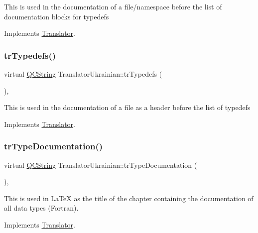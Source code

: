 This is used in the documentation of a file/namespace before the list of documentation blocks for typedefs 

Implements \mbox{\hyperlink{class_translator}{Translator}}.

\mbox{\label{class_translator_ukrainian_aa6afa4bd0bea30c61456a1add6b651b0}} 
\subsubsection{\texorpdfstring{trTypedefs()}{trTypedefs()}}
{\footnotesize\ttfamily virtual \mbox{\hyperlink{class_q_c_string}{Q\+C\+String}} Translator\+Ukrainian\+::tr\+Typedefs (\begin{DoxyParamCaption}{ }\end{DoxyParamCaption})\hspace{0.3cm}{\ttfamily [inline]}, {\ttfamily [virtual]}}

This is used in the documentation of a file as a header before the list of typedefs 

Implements \mbox{\hyperlink{class_translator}{Translator}}.

\mbox{\label{class_translator_ukrainian_a03be0812e80613b2d1fe77394ffea483}} 
\subsubsection{\texorpdfstring{trTypeDocumentation()}{trTypeDocumentation()}}
{\footnotesize\ttfamily virtual \mbox{\hyperlink{class_q_c_string}{Q\+C\+String}} Translator\+Ukrainian\+::tr\+Type\+Documentation (\begin{DoxyParamCaption}{ }\end{DoxyParamCaption})\hspace{0.3cm}{\ttfamily [inline]}, {\ttfamily [virtual]}}

This is used in La\+TeX as the title of the chapter containing the documentation of all data types (Fortran). 

Implements \mbox{\hyperlink{class_translator}{Translator}}.

